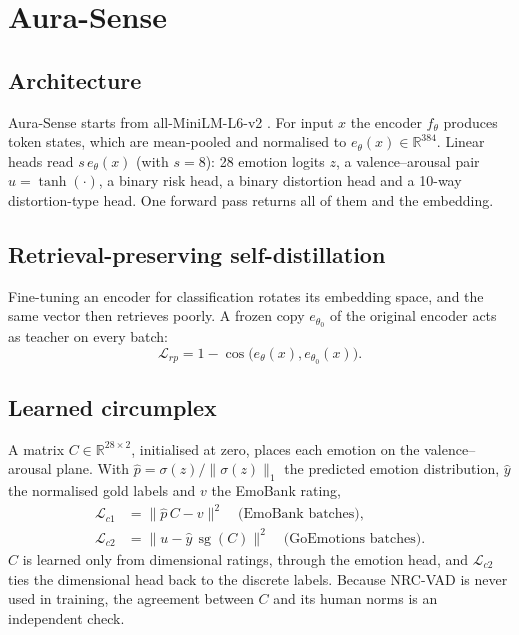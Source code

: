 \documentclass[conference]{IEEEtran}
\newcommand{\sg}{\operatorname{sg}}
\begin{document}
\section{Aura-Sense}

\subsection{Architecture}
Aura-Sense starts from all-MiniLM-L6-v2 \cite{reimers2019,wang2020minilm}. For input $x$ the encoder $f_\theta$ produces token states, which are mean-pooled and normalised to $e_\theta(x)\in\mathbb{R}^{384}$. Linear heads read $s\,e_\theta(x)$ (with $s=8$): 28 emotion logits $z$, a valence--arousal pair $u=\tanh(\cdot)$, a binary risk head, a binary distortion head and a 10-way distortion-type head. One forward pass returns all of them and the embedding.

\subsection{Retrieval-preserving self-distillation}
Fine-tuning an encoder for classification rotates its embedding space, and the same vector then retrieves poorly. A frozen copy $e_{\theta_0}$ of the original encoder acts as teacher on every batch:
\begin{equation}
\mathcal{L}_{rp} = 1 - \cos\big(e_\theta(x), e_{\theta_0}(x)\big).
\end{equation}

\subsection{Learned circumplex}
A matrix $C\in\mathbb{R}^{28\times2}$, initialised at zero, places each emotion on the valence--arousal plane. With $\hat p = \sigma(z)/\lVert\sigma(z)\rVert_1$ the predicted emotion distribution, $\hat y$ the normalised gold labels and $v$ the EmoBank rating,
\begin{align}
\mathcal{L}_{c1} &= \lVert \hat p\, C - v \rVert^2 \quad \text{(EmoBank batches)},\\
\mathcal{L}_{c2} &= \lVert u - \hat y\, \sg(C) \rVert^2 \quad \text{(GoEmotions batches)}.
\end{align}
$C$ is learned only from dimensional ratings, through the emotion head, and $\mathcal{L}_{c2}$ ties the dimensional head back to the discrete labels. Because NRC-VAD \cite{mohammad2018} is never used in training, the agreement between $C$ and its human norms is an independent check.
\end{document}
